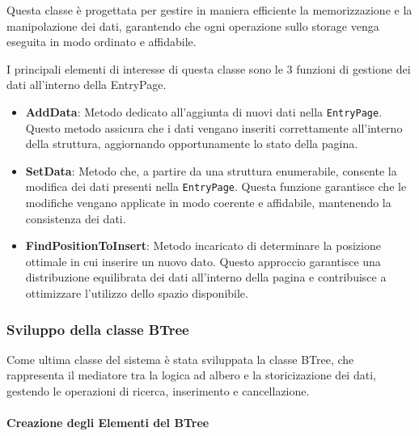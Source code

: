 \documentclass[12pt,a4paper,openright,twoside]{book}
\begin{document}
                Questa classe è progettata per gestire in maniera efficiente la memorizzazione e la manipolazione dei dati, garantendo che ogni operazione sullo storage venga eseguita in modo ordinato e affidabile.

                

                I principali elementi di interesse di questa classe sono le 3 funzioni di gestione dei dati all'interno della EntryPage.

                \begin{itemize}
                    \item \textbf{AddData}: Metodo dedicato all'aggiunta di nuovi dati nella \texttt{EntryPage}. Questo metodo assicura che i dati vengano inseriti correttamente all'interno della struttura, aggiornando opportunamente lo stato della pagina.
                    \item \textbf{SetData}: Metodo che, a partire da una struttura enumerabile, consente la modifica dei dati presenti nella \texttt{EntryPage}.
                    Questa funzione garantisce che le modifiche vengano applicate in modo coerente e affidabile, mantenendo la consistenza dei dati.
                    \item \textbf{FindPositionToInsert}: Metodo incaricato di determinare la posizione ottimale in cui inserire un nuovo dato. Questo approccio garantisce una distribuzione equilibrata dei dati all'interno della pagina e contribuisce a ottimizzare l'utilizzo dello spazio disponibile.
                \end{itemize}

            \subsubsection{Sviluppo della classe BTree}

                Come ultima classe del sistema è stata sviluppata la classe BTree, che rappresenta il mediatore tra la logica ad albero e la storicizazione dei dati, gestendo le operazioni di ricerca, inserimento e cancellazione.

                \paragraph{Creazione degli Elementi del BTree}

                    
\end{document}
